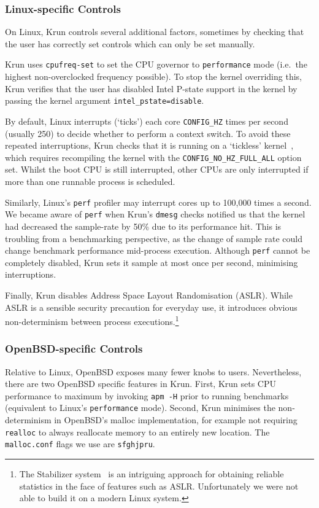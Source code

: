 \documentclass[preprint,numbers,10pt]{sigplanconf}
\newcommand{\krun}{Krun\xspace}
\begin{document}
\subsubsection{Linux-specific Controls}

On Linux, \krun controls several additional factors, sometimes by checking that
the user has correctly set controls which can only be set manually.

\krun uses \texttt{cpufreq-set} to set the CPU governor to \texttt{performance} mode
(i.e.~the highest non-overclocked frequency possible).
To stop the kernel overriding this, \krun verifies that the user has disabled
Intel P-state support in the kernel by passing the kernel argument
\texttt{intel\_pstate=disable}.

By default, Linux interrupts (`ticks') each core
\texttt{CONFIG\_HZ} times per second (usually 250) to
decide whether to perform a context switch. To avoid these repeated
interruptions, \krun checks that it is running on a `tickless'
kernel~\cite{tickless}, which requires recompiling the kernel with the
\texttt{CONFIG\_NO\_HZ\_FULL\_ALL} option set. Whilst the boot CPU is still
interrupted, other CPUs are only
interrupted if more than one runnable process is scheduled.

Similarly, Linux's \texttt{perf} profiler may interrupt cores up to 100,000 times a
second. We became aware of \texttt{perf} when \krun's \texttt{dmesg} checks
notified us that the kernel had decreased the sample-rate by
50\% due to its performance hit. This is troubling
from a benchmarking perspective, as the change of sample rate could change
benchmark performance mid-process execution. Although
\texttt{perf} cannot be completely disabled, \krun sets it sample at most
once per second, minimising interruptions.

Finally, \krun disables Address Space Layout Randomisation (ASLR). While ASLR is
a sensible security precaution for everyday use, it introduces obvious
non-determinism between process executions.\footnote{The Stabilizer
system~\cite{curtsinger13stabilizer} is an intriguing approach for obtaining reliable
statistics in the face of features such as ASLR. Unfortunately we were not able
to build it on a modern Linux system.}


\subsubsection{OpenBSD-specific Controls}

Relative to Linux, OpenBSD exposes many fewer knobs to users. Nevertheless,
there are two OpenBSD specific features in \krun.
First, \krun sets CPU performance to maximum by invoking \texttt{apm -H} prior
to running benchmarks (equivalent to Linux's \texttt{performance} mode).
Second, \krun minimises the non-determinism in OpenBSD's malloc implementation,
for example not requiring \texttt{realloc} to always reallocate memory to
an entirely new location. The \texttt{malloc.conf} flags we use are \texttt{sfghjpru}.
\end{document}
